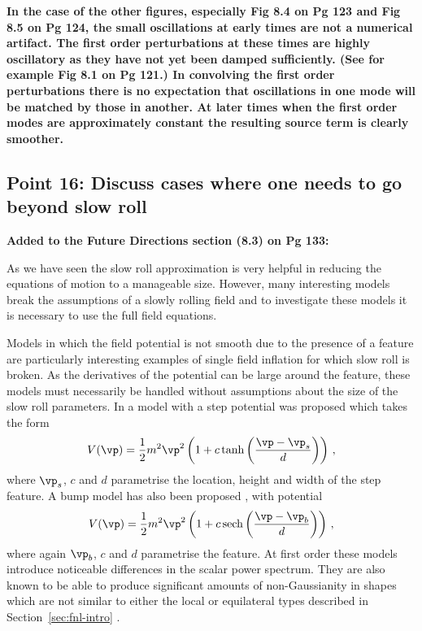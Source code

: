 \textbf{In the case of the other figures, especially Fig 8.4 on Pg 123 and Fig 8.5 on Pg 124, the
small oscillations at early times are not a numerical artifact. The first order perturbations at
these times are highly oscillatory as they have not yet been damped sufficiently. (See for example
Fig 8.1 on Pg 121.) In convolving the first order perturbations there is no expectation that
oscillations in one mode will be matched by those in another. At later times when the first order
modes are approximately constant the resulting source term is clearly smoother. 
}


\subsection{Point 16: Discuss cases where one needs to go beyond slow roll}

\textbf{Added to the Future Directions section (8.3) on Pg 133:}

As we have seen the slow roll approximation is very helpful in reducing the equations of motion to
a manageable size. However, many interesting models break the assumptions of a slowly rolling field
and to investigate these models it is necessary to use the full field equations.

Models in which the field potential is not smooth due to the presence of a feature are
particularly interesting examples of single field inflation for which slow roll is broken. 
As the
derivatives of the potential can be large around the feature, these models must necessarily be
handled without assumptions about the size of the slow roll parameters. 
In  a model with a step potential was proposed which takes the form
% 
\begin{equation}
 V(\vp) = \frac{1}{2}m^2\vp^2\left(1 + c\tanh\left(\frac{\vp -\vp_s}{d}\right)\right)\,,
\end{equation}
% 
where $\vp_s$, $c$ and $d$ parametrise the location, height and width of the step feature. A bump
model has also been proposed \cite{Chen:2008wn}, with potential 
% 
\begin{equation}
 V(\vp) = \frac{1}{2}m^2\vp^2\left(1 + c\,\mathrm{sech}\left(\frac{\vp-\vp_b}{d}\right)\right)\,,
\end{equation}
% 
where again $\vp_b$, $c$ and $d$ parametrise the feature. At first order these models introduce
noticeable differences in the scalar power spectrum. They are also known to be able to produce
significant amounts of non-Gaussianity in shapes which are not similar to either the local or
equilateral types described in Section~\ref{sec:fnl-intro} \cite{Chen:2006xjb, Chen:2008wn}.


